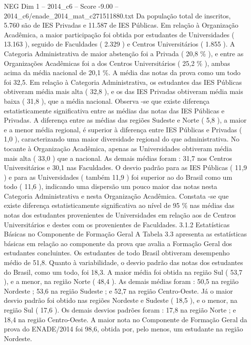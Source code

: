 \begin{textsample}{NEG Dim 1 – 2014\_c6 – Score -9.00 – 2014\_c6/enade\_2014\_mat\_c271511880.txt}
Da população total de inscritos, 5.760 são de IES Privadas e 11.587 de IES Públicas.
Em relação à Organização Acadêmica, a maior participação foi obtida por estudantes de Universidades ( 13.163 ), seguido de Faculdades ( 2.329 ) e Centros Universitários ( 1.855 ).
A Categoria Administrativa de maior abstenção foi a Privada ( 20,8 \% ), e entre as Organizações Acadêmicas foi a dos Centros Universitários ( 25,2 \% ), ambas acima da média nacional de 20,1 \%.
A média das notas da prova como um todo foi 32,5.
Em relação à Categoria Administrativa, os estudantes das IES Públicas obtiveram média mais alta ( 32,8 ), e os das IES Privadas obtiveram média mais baixa ( 31,8 ), que a média nacional.
Observa -se que existe diferença estatisticamente significativa entre as médias das notas das IES Públicas e Privadas.
A diferença entre as médias das regiões Sudeste e Norte ( 5,8 ), a maior e a menor média regional, é superior à diferença entre IES Públicas e Privadas ( 1,0 ), caracterizando uma maior diversidade regional do que administrativa.
No tocante à Organização Acadêmica, apenas as Universidades obtiveram média mais alta ( 33,0 ) que a nacional.
As demais médias foram : 31,7 nos Centros Universitários e 30,1 nas Faculdades.
O desvio padrão para as IES Públicas ( 11,9 ) e para as Universidades ( também 11,9 ) foi superior ao do Brasil como um todo ( 11,6 ), indicando uma dispersão um pouco maior das notas nesta Categoria Administrativa e nesta Organização Acadêmica.
Constata -se que existe diferença estatisticamente significativa ao nível de 95 \% nas médias das notas dos estudantes provenientes de Universidades em relação aos de Centros Universitários e destes com os provenientes de Faculdades. 3.1.2 Estatísticas Básicas no Componente de Formação Geral A Tabela 3.3 apresenta as estatísticas básicas em relação ao componente da prova que avalia a Formação Geral dos estudantes concluintes.
Os estudantes de todo Brasil obtiveram desempenho médio de 51,8.
Quanto à variabilidade, o desvio padrão das notas dos estudantes do Brasil, como um todo, foi 18,3.
A maior média foi obtida na região Sul ( 53,7 ), e a menor, na região Norte ( 48,4 ).
As demais médias foram : 50,5 na região Nordeste ; 53,6 na região Sudeste ; e 52,7 na região Centro-Oeste.
Já o maior desvio padrão foi obtido nas regiões Nordeste e Sudeste ( 18,5 ), e o menor, na região Sul ( 17,6 ).
Os demais desvios padrões foram : 17,8 na região Norte ; e 18,4 na região Centro-Oeste.
A maior nota no Componente de Formação Geral da prova do ENADE/2014 foi 98,6, obtida por, pelo menos, um estudante na região Nordeste.

\end{textsample}
